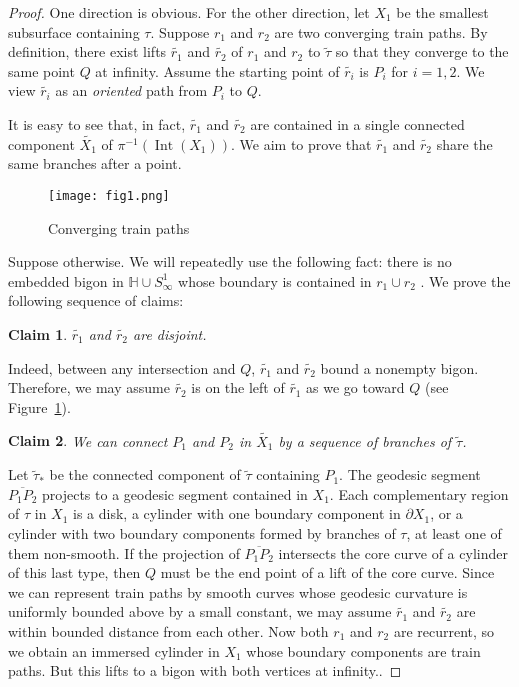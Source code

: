 \documentclass[11pt]{article} %
\theoremstyle{plain}
\newtheorem{clmA}{Claim}
\theoremstyle{definition}
\DeclareMathOperator{\Int}{Int}
\numberwithin{equation}{section}
\begin{document}
\begin{proof}
One direction is obvious. For the other direction, let $X_1$ be the smallest subsurface containing $\tau$. Suppose $r_1$ and $r_2$ are two converging train paths. By definition, there exist lifts $\widetilde{r_1}$ and $\widetilde{r_2}$ of $r_1$ and $r_2$ to $\widetilde\tau$ so that they converge to the same point $Q$ at infinity. Assume the starting point of $\widetilde{r_i}$ is $P_i$ for $i=1,2$. We view $\widetilde{r_i}$ as an \emph{oriented} path from $P_i$ to $Q$. 

 It is easy to see that, in fact, $\widetilde{r_1}$ and $\widetilde{r_2}$ are contained in a single connected component $\widetilde{X_1}$ of $\pi^{-1}(\Int(X_1))$. We aim to prove that $\widetilde{r_1}$ and $\widetilde{r_2}$ share the same branches after a point. 
\begin{figure}[ht!]
    \centering
    \texttt{[image: fig1.png]}
    \caption{Converging train paths}
    \label{tr1}
\end{figure}

Suppose otherwise. We will repeatedly use the following fact: there is no embedded bigon in $\mathbb{H} \cup S_{\infty}^1$ whose boundary is contained in $r_1 \cup r_2$ \cite[Prop.\ 1.5.2]{com.tr}. We prove the following sequence of claims:
\begin{clmA} 
$\widetilde{r_1}$ and $\widetilde{r_2}$ are disjoint.
\end{clmA}
Indeed, between any intersection and $Q$, $\widetilde{r_1}$ and $\widetilde{r_2}$ bound a nonempty bigon. Therefore, we may assume $\widetilde{r_2}$ is on the left of $\widetilde{r_1}$ as we go toward $Q$ (see Figure~\ref{tr1}).

\begin{clmA}
We can connect $P_1$ and $P_2$ in $\widetilde{X_1}$ by a sequence of branches of $\widetilde{\tau}$.
\end{clmA}
Let $\widetilde{\tau}_*$ be the connected component of $\widetilde\tau$ containing $P_1$. The geodesic segment $\overline{P_1P_2}$ projects to a geodesic segment contained in $X_1$. Each complementary region of $\tau$ in $X_1$ is a disk, a cylinder with one boundary component in $\partial X_1$, or a cylinder with two boundary components formed by branches of $\tau$, at least one of them non-smooth. If the projection of $\overline{P_1P_2}$ intersects the core curve of a cylinder of this last type, then $Q$ must be the end point of a lift of the core curve. Since we can represent train paths by smooth curves whose geodesic curvature is uniformly bounded above by a small constant, we may assume $\widetilde{r_1}$ and $\widetilde{r_2}$ are within bounded distance from each other. Now both $r_1$ and $r_2$ are recurrent, so we obtain an immersed cylinder in $X_1$ whose boundary components are train paths. But this lifts to a bigon with both vertices at infinity..


\end{proof}
\end{document}
